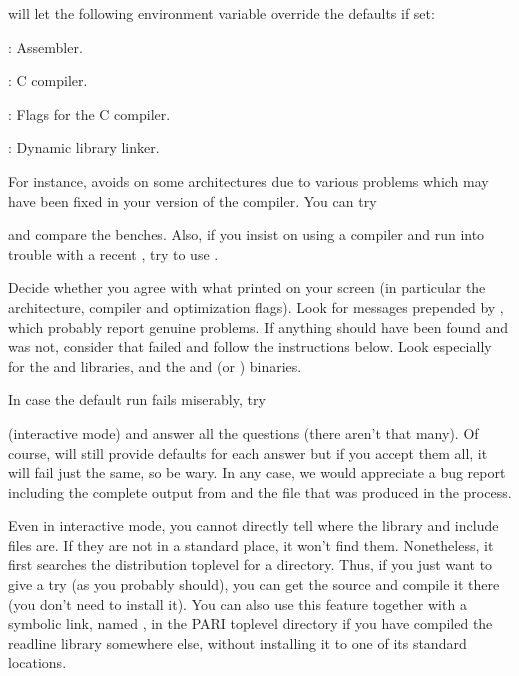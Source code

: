 
\noindent {} will let the following environment variable
override the defaults if set:

: Assembler.

: C compiler.

: Flags for the C compiler.

: Dynamic library linker.

\noindent For instance,  avoids  on some
architectures due to various problems which may have been fixed in your
version of the compiler. You can try


\noindent and compare the benches. Also, if you insist on using a 
compiler and run into trouble with a recent , try to use
.

 Decide whether you agree with what
 printed on your screen (in particular the architecture,
compiler and optimization flags). Look for messages prepended by
\kbd{\#\#\#}, which probably report genuine problems. If anything should have
been found and was not, consider that  failed and follow the
instructions below. Look especially for the  and 
libraries, and the  and  (or ) binaries.

In case the default  run fails miserably, try


\noindent (interactive mode) and answer all the questions (there aren't that
many). Of course,  will still provide defaults for each answer
but if you accept them all, it will fail just the same, so be wary. In any
case, we would appreciate a bug report including the complete output from
 and the file  that was produced in
the process.

Even in interactive mode, you cannot directly tell 
where the  library and include files are. If they are not in a
standard place, it won't find them. Nonetheless, it first searches the
distribution toplevel for a  directory. Thus, if you just want
to give  a try (as you probably should), you can get the source
and compile it there (you don't need to install it). You can also use this
feature together with a symbolic link, named , in the PARI
toplevel directory if you have compiled the readline library somewhere else,
without installing it to one of its standard locations. 

